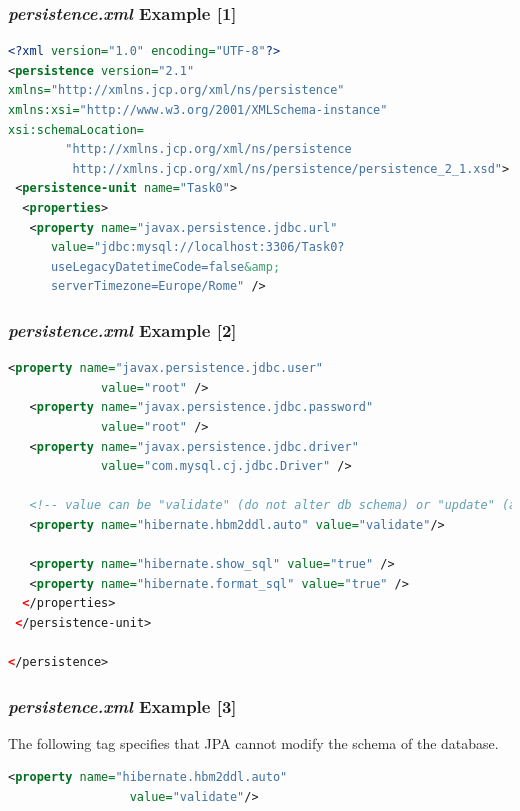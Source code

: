 \documentclass{beamer}
\begin{document}
\begin{frame} [fragile]
\frametitle{\textit{persistence.xml} Example [1]}
\begin{lstlisting}[language=xml, caption=persistence.xml example]
<?xml version="1.0" encoding="UTF-8"?>
<persistence version="2.1" 
xmlns="http://xmlns.jcp.org/xml/ns/persistence"
xmlns:xsi="http://www.w3.org/2001/XMLSchema-instance"
xsi:schemaLocation=
		"http://xmlns.jcp.org/xml/ns/persistence
		 http://xmlns.jcp.org/xml/ns/persistence/persistence_2_1.xsd">
 <persistence-unit name="Task0">
  <properties>
   <property name="javax.persistence.jdbc.url"
	  value="jdbc:mysql://localhost:3306/Task0?
	  useLegacyDatetimeCode=false&amp;
	  serverTimezone=Europe/Rome" />
\end{lstlisting}
\end{frame}

\begin{frame} [fragile]
\frametitle{\textit{persistence.xml} Example [2]}
\begin{lstlisting}[language=xml, caption=persistence.xml example]
   <property name="javax.persistence.jdbc.user"
   			 value="root" />
   <property name="javax.persistence.jdbc.password"
   			 value="root" />
   <property name="javax.persistence.jdbc.driver"
   			 value="com.mysql.cj.jdbc.Driver" />

   <!-- value can be "validate" (do not alter db schema) or "update" (alter db schema) -->
   <property name="hibernate.hbm2ddl.auto" value="validate"/>

   <property name="hibernate.show_sql" value="true" />
   <property name="hibernate.format_sql" value="true" />
  </properties>
 </persistence-unit>

</persistence>

\end{lstlisting}
\end{frame}

\begin{frame} [fragile]
\frametitle{\textit{persistence.xml} Example [3]}
The following tag specifies that JPA cannot modify the schema of the database.
\begin{lstlisting}[language=xml, caption=persistence.xml example]
<property name="hibernate.hbm2ddl.auto"
		  		 value="validate"/>
\end{lstlisting}
\end{frame}
\end{document}
